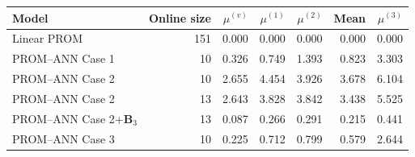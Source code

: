 \begin{tabular}{lr|rrrr|r}
\toprule
Model & Online size & $\mu^{(v)}$ & $\mu^{(1)}$ & $\mu^{(2)}$ & Mean & $\mu^{(3)}$ \\
\midrule
Linear PROM & 151 & 0.000 & 0.000 & 0.000 & 0.000 & 0.000 \\
PROM--ANN Case 1 & 10 & 0.326 & 0.749 & 1.393 & 0.823 & 3.303 \\
PROM--ANN Case 2 & 10 & 2.655 & 4.454 & 3.926 & 3.678 & 6.104 \\
PROM--ANN Case 2 & 13 & 2.643 & 3.828 & 3.842 & 3.438 & 5.525 \\
PROM--ANN Case 2+$\mathbf B_3$ & 13 & 0.087 & 0.266 & 0.291 & 0.215 & 0.441 \\
PROM--ANN Case 3 & 10 & 0.225 & 0.712 & 0.799 & 0.579 & 2.644 \\
\bottomrule
\end{tabular}
